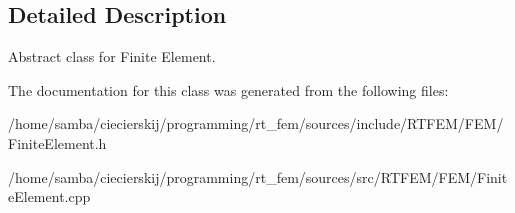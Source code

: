 \subsection{Detailed Description}
Abstract class for Finite Element. 

The documentation for this class was generated from the following files\+:\begin{DoxyCompactItemize}
\item 
/home/samba/ciecierskij/programming/rt\+\_\+fem/sources/include/\+R\+T\+F\+E\+M/\+F\+E\+M/Finite\+Element.\+h\item 
/home/samba/ciecierskij/programming/rt\+\_\+fem/sources/src/\+R\+T\+F\+E\+M/\+F\+E\+M/Finite\+Element.\+cpp\end{DoxyCompactItemize}
